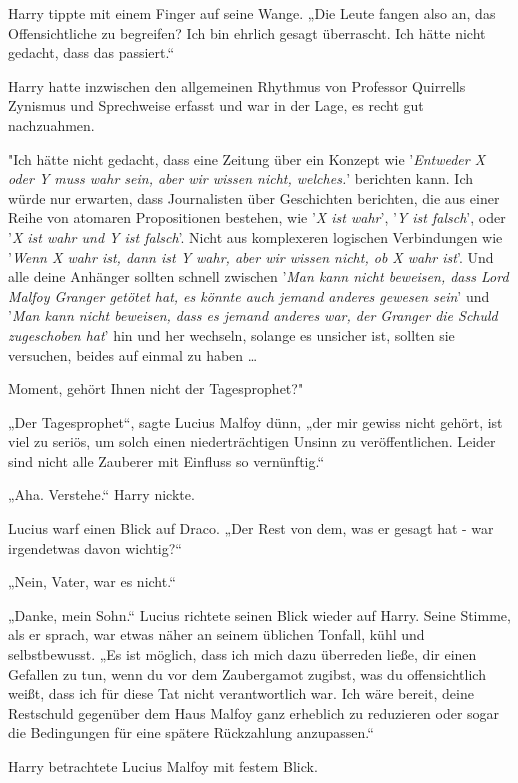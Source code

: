 {Harry tippte mit einem Finger auf seine Wange. „Die Leute fangen also an, das Offensichtliche zu begreifen? Ich bin ehrlich gesagt überrascht. Ich hätte nicht gedacht, dass das passiert.“

Harry hatte inzwischen den allgemeinen Rhythmus von Professor Quirrells Zynismus und Sprechweise erfasst und war in der Lage, es recht gut nachzuahmen.

"Ich hätte nicht gedacht, dass eine Zeitung über ein Konzept wie '\emph{Entweder X oder Y muss wahr sein, aber wir wissen nicht, welches.}' berichten kann. Ich würde nur erwarten, dass Journalisten über Geschichten berichten, die aus einer Reihe von atomaren Propositionen bestehen, wie '\emph{X ist wahr}', '\emph{Y ist falsch}', oder '\emph{X ist wahr und Y ist falsch}'. Nicht aus komplexeren logischen Verbindungen wie '\emph{Wenn X wahr ist, dann ist Y wahr, aber wir wissen nicht, ob X wahr ist}'. Und alle deine Anhänger sollten schnell zwischen '\emph{Man kann nicht beweisen, dass Lord Malfoy Granger getötet hat, es könnte auch jemand anderes gewesen sein}' und '\emph{Man kann nicht beweisen, dass es jemand anderes war, der Granger die Schuld zugeschoben hat}' hin und her wechseln, solange es unsicher ist, sollten sie versuchen, beides auf einmal zu haben …

Moment, gehört Ihnen nicht der Tagesprophet?"

„Der Tagesprophet“, sagte Lucius Malfoy dünn, „der mir gewiss nicht gehört, ist viel zu seriös, um solch einen niederträchtigen Unsinn zu veröffentlichen. Leider sind nicht alle Zauberer mit Einfluss so vernünftig.“

„Aha. Verstehe.“ Harry nickte.

Lucius warf einen Blick auf Draco. „Der Rest von dem, was er gesagt hat - war irgendetwas davon wichtig?“

„Nein, Vater, war es nicht.“

„Danke, mein Sohn.“ Lucius richtete seinen Blick wieder auf Harry. Seine Stimme, als er sprach, war etwas näher an seinem üblichen Tonfall, kühl und selbstbewusst. „Es ist möglich, dass ich mich dazu überreden ließe, dir einen Gefallen zu tun, wenn du vor dem Zaubergamot zugibst, was du offensichtlich weißt, dass ich für diese Tat nicht verantwortlich war. Ich wäre bereit, deine Restschuld gegenüber dem Haus Malfoy ganz erheblich zu reduzieren oder sogar die Bedingungen für eine spätere Rückzahlung anzupassen.“

Harry betrachtete Lucius Malfoy mit festem Blick.

}
